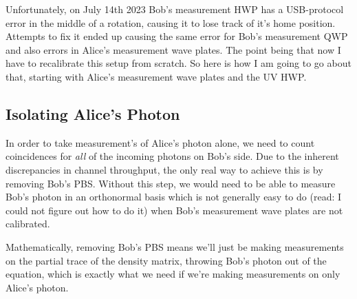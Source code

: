 \documentclass{paper}[11pt]
\begin{document}
	Unfortunately, on July 14th 2023 Bob's measurement HWP has a USB-protocol error in the middle of a rotation, causing it to lose track of it's home position. Attempts to fix it ended up causing the same error for Bob's measurement QWP and also errors in Alice's measurement wave plates. The point being that now I have to recalibrate this setup from scratch. So here is how I am going to go about that, starting with Alice's measurement wave plates and the UV HWP.
	
	\subsection{Isolating Alice's Photon}
	In order to take measurement's of Alice's photon alone, we need to count coincidences for \textit{all} of the incoming photons on Bob's side. Due to the inherent discrepancies in channel throughput, the only real way to achieve this is by removing Bob's PBS. Without this step, we would need to be able to measure Bob's photon in an orthonormal basis which is not generally easy to do (read: I could not figure out how to do it) when Bob's measurement wave plates are not calibrated.
	
	Mathematically, removing Bob's PBS means we'll just be making measurements on the partial trace of the density matrix, throwing Bob's photon out of the equation, which is exactly what we need if we're making measurements on only Alice's photon.
	
\end{document}
